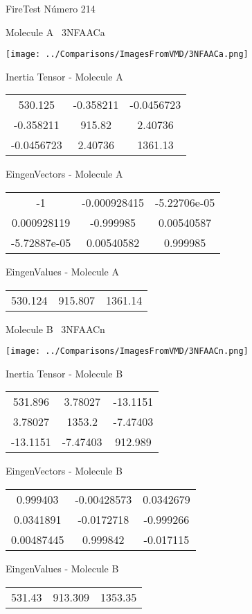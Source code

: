 \vtab[-3cm]
\begin{center}
{\large FireTest \tab Número 214}
\end{center}
\begin{multicols}{2}
\begin{center}

Molecule A \
3NFAACa

\texttt{[image: ../Comparisons/ImagesFromVMD/3NFAACa.png]}

Inertia Tensor - Molecule A \\
\begin{tabular}{|c c c|}
530.125	 & 	-0.358211	 & 	-0.0456723	 \\
-0.358211	 & 	915.82	 & 	2.40736	 \\
-0.0456723	 & 	2.40736	 & 	1361.13
\end{tabular}

\vtab
 EingenVectors - Molecule A     \\
\begin{tabular}{|c c c|}
-1	 & 	-0.000928415	 & 	-5.22706e-05	 \\
0.000928119	 & 	-0.999985	 & 	0.00540587	 \\
-5.72887e-05	 & 	0.00540582	 & 	0.999985
\end{tabular}

\vtab
 EingenValues - Molecule A     \\
\begin{tabular}{|c c c|}
530.124	 & 	915.807	 & 	1361.14	 \\
\end{tabular}
\columnbreak

Molecule B \
3NFAACn

\texttt{[image: ../Comparisons/ImagesFromVMD/3NFAACn.png]}

Inertia Tensor - Molecule B \\
\begin{tabular}{|c c c|}
531.896	 & 	3.78027	 & 	-13.1151	 \\
3.78027	 & 	1353.2	 & 	-7.47403	 \\
-13.1151	 & 	-7.47403	 & 	912.989
\end{tabular}

\vtab
 EingenVectors - Molecule B     \\
\begin{tabular}{|c c c|}
0.999403	 & 	-0.00428573	 & 	0.0342679	 \\
0.0341891	 & 	-0.0172718	 & 	-0.999266	 \\
0.00487445	 & 	0.999842	 & 	-0.017115
\end{tabular}

\vtab
 EingenValues - Molecule B     \\
\begin{tabular}{|c c c|}
531.43	 & 	913.309	 & 	1353.35	 \\
\end{tabular}

\end{center}
\end{multicols}

